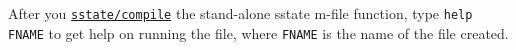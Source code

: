 


	After you \href{sstate/compile}{\texttt{sstate/compile}} the stand-alone
sstate m-file function, type \texttt{help FNAME} to get help on running
the file, where \texttt{FNAME} is the name of the file created.


